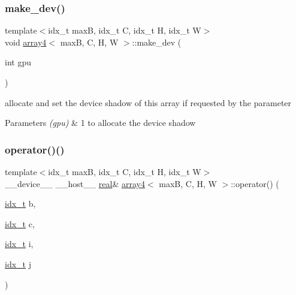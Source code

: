 \subsubsection{\texorpdfstring{make\+\_\+dev()}{make\_dev()}}
{\footnotesize\ttfamily template$<$idx\+\_\+t maxB, idx\+\_\+t C, idx\+\_\+t H, idx\+\_\+t W$>$ \\
void \hyperlink{structarray4}{array4}$<$ maxB, C, H, W $>$\+::make\+\_\+dev (\begin{DoxyParamCaption}\item[{int}]{gpu }\end{DoxyParamCaption})\hspace{0.3cm}{\ttfamily [inline]}}



allocate and set the device shadow of this array if requested by the parameter 


\begin{DoxyParams}{Parameters}
{\em (gpu)} & 1 to allocate the device shadow \\
\hline
\end{DoxyParams}
\mbox{\label{structarray4_aeaa87655f2ae1ce11e5522db4b28671d}} 
\subsubsection{\texorpdfstring{operator()()}{operator()()}}
{\footnotesize\ttfamily template$<$idx\+\_\+t maxB, idx\+\_\+t C, idx\+\_\+t H, idx\+\_\+t W$>$ \\
\+\_\+\+\_\+device\+\_\+\+\_\+ \+\_\+\+\_\+host\+\_\+\+\_\+ \hyperlink{vgg__util_8h_a1082d08aaa761215ec83e7149f27ad16}{real}\& \hyperlink{structarray4}{array4}$<$ maxB, C, H, W $>$\+::operator() (\begin{DoxyParamCaption}\item[{\hyperlink{vgg__util_8h_a8e93478a00e685bea5e6a3f617bf03a3}{idx\+\_\+t}}]{b,  }\item[{\hyperlink{vgg__util_8h_a8e93478a00e685bea5e6a3f617bf03a3}{idx\+\_\+t}}]{c,  }\item[{\hyperlink{vgg__util_8h_a8e93478a00e685bea5e6a3f617bf03a3}{idx\+\_\+t}}]{i,  }\item[{\hyperlink{vgg__util_8h_a8e93478a00e685bea5e6a3f617bf03a3}{idx\+\_\+t}}]{j }\end{DoxyParamCaption})\hspace{0.3cm}{\ttfamily [inline]}}



